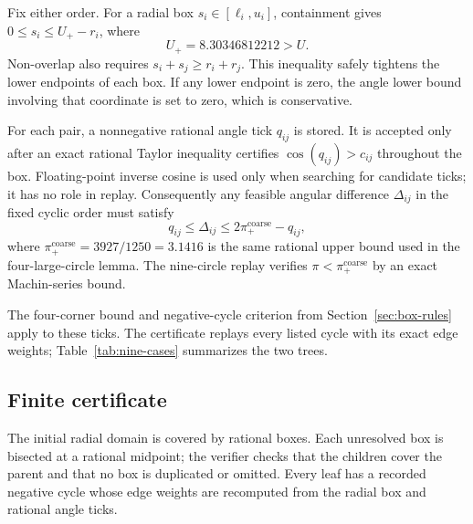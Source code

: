 \documentclass[11pt,a4paper]{article}
\theoremstyle{remark}
\newcommand{\Rcap}{U}
\begin{document}
Fix either order.  For a radial box $s_i\in[\ell_i,u_i]$, containment gives
$0\le s_i\le\Rcap_+-r_i$, where
\[
  \Rcap_+=8.30346812212>\Rcap.
\]
Non-overlap also requires $s_i+s_j\ge r_i+r_j$.  This inequality safely
tightens the lower endpoints of each box.  If any lower endpoint is zero,
the angle lower bound involving that coordinate is set to zero, which is
conservative.

For each pair, a nonnegative rational angle tick $q_{ij}$ is stored.  It is
accepted only after an exact rational Taylor inequality certifies
$\cos(q_{ij})>c_{ij}$ throughout the box.  Floating-point inverse cosine is
used only when searching for candidate ticks; it has no role in replay.
Consequently any feasible angular difference $\Delta_{ij}$ in the fixed
cyclic order must satisfy
\[
  q_{ij}\le \Delta_{ij}\le 2\pi_+^{\mathrm{coarse}}-q_{ij},
\]
where $\pi_+^{\mathrm{coarse}}=3927/1250=3.1416$ is the same rational upper
bound used in the four-large-circle lemma.  The nine-circle replay verifies
$\pi<\pi_+^{\mathrm{coarse}}$ by an exact Machin-series bound.

The four-corner bound and negative-cycle criterion from
Section~\ref{sec:box-rules} apply to these ticks.  The certificate replays
every listed cycle with its exact edge weights; Table~\ref{tab:nine-cases}
summarizes the two trees.

\subsection{Finite certificate}

The initial radial domain is covered by rational boxes.  Each unresolved box
is bisected at a rational midpoint; the verifier checks that the children
cover the parent and that no box is duplicated or omitted.  Every leaf has
a recorded negative cycle whose edge weights are recomputed from the radial
box and rational angle ticks.
\end{document}
